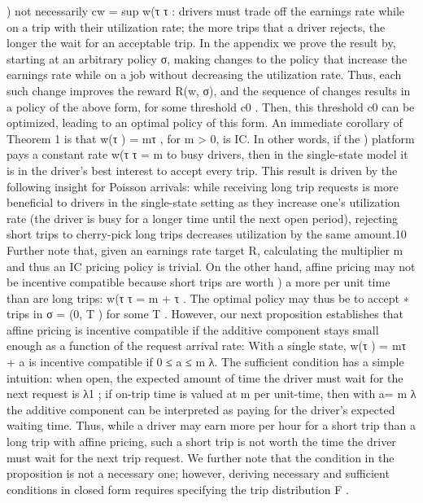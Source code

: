 \documentclass[10pt]{article}
\begin{document}
\begin{ReviewVerbatim}
)
not necessarily cw = sup w(τ
τ : drivers must trade off the earnings rate while on a trip with their
utilization rate; the more trips that a driver rejects, the longer the wait for an acceptable trip. In
the appendix we prove the result by, starting at an arbitrary policy σ, making changes to the policy
that increase the earnings rate while on a job without decreasing the utilization rate. Thus, each
such change improves the reward R(w, σ), and the sequence of changes results in a policy of the
above form, for some threshold c0 . Then, this threshold c0 can be optimized, leading to an optimal
policy of this form.
An immediate corollary of Theorem 1 is that w(τ ) = mτ , for m > 0, is IC. In other words, if the
)
platform pays a constant rate w(τ
τ = m to busy drivers, then in the single-state model it is in the
driver’s best interest to accept every trip. This result is driven by the following insight for Poisson
arrivals: while receiving long trip requests is more beneficial to drivers in the single-state setting as
they increase one’s utilization rate (the driver is busy for a longer time until the next open period),
rejecting short trips to cherry-pick long trips decreases utilization by the same amount.10 Further
note that, given an earnings rate target R, calculating the multiplier m and thus an IC pricing
policy is trivial.
On the other hand, affine pricing may not be incentive compatible because short trips are worth
)
a
more per unit time than are long trips: w(τ
τ = m + τ . The optimal policy may thus be to accept
∗
trips in σ = (0, T ) for some T . However, our next proposition establishes that affine pricing is
incentive compatible if the additive component stays small enough as a function of the request
arrival rate:
With a single state, w(τ ) = mτ + a is incentive compatible if 0 ≤ a ≤ m
λ.
The sufficient condition has a simple intuition: when open, the expected amount of time the
driver must wait for the next request is λ1 ; if on-trip time is valued at m per unit-time, then with
a= m
λ the additive component can be interpreted as paying for the driver’s expected waiting time.
Thus, while a driver may earn more per hour for a short trip than a long trip with affine pricing,
such a short trip is not worth the time the driver must wait for the next trip request. We further
note that the condition in the proposition is not a necessary one; however, deriving necessary and
sufficient conditions in closed form requires specifying the trip distribution F .
\end{ReviewVerbatim}
\end{document}
